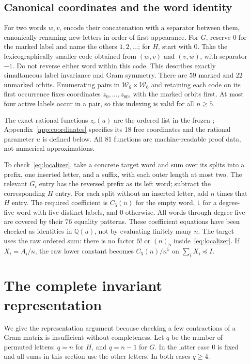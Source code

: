 \documentclass[11pt]{article}
\newcommand{\W}{\mathcal W}
\newcommand{\Q}{\mathbb Q}
\begin{document}
\subsection{Canonical coordinates and the word identity}
For two words $w,v$, encode their concatenation with a separator between
them, canonically renaming new letters in order of first appearance.
For $G$, reserve $0$ for the marked label and name the others $1,2,\ldots$;
for $H$, start with $0$. Take the lexicographically smaller code obtained
from $(w,v)$ and $(v,w)$, with separator $-1$. Do not reverse either word
within this code. This describes exactly simultaneous label invariance
and Gram symmetry. There are $59$ marked and $22$ unmarked orbits.
Enumerating pairs in $\W_6\times\W_6$ and retaining each code on its
first occurrence fixes coordinates $z_0,\ldots,z_{80}$, with the marked
orbits first. At most four active labels occur in a pair, so this indexing
is valid for all $n\ge5$.

The exact rational functions $z_c(u)$ are the ordered list
 in the frozen ;
Appendix~\ref{app:coordinates} specifies its 18 free coordinates and
the rational parameter $u$ is defined below. All $81$ functions are
machine-readable proof data, not numerical approximations.

To check~\eqref{eq:localizer}, take a concrete target word and sum over
its splits into a prefix, one inserted letter, and a suffix, with each
outer length at most two. The relevant $G_i$ entry has the reversed
prefix as its left word; subtract the corresponding $H$ entry. For
each split without an inserted letter, add $n$ times that $H$ entry.
The required coefficient is $C_5(n)$ for the empty word, $1$ for a
degree-five word with five distinct labels, and $0$ otherwise.
All words through degree five are covered by their $76$ equality
patterns. These coefficient equations have been checked as identities
in $\Q(u)$, not by evaluating finitely many $n$.
The target uses the raw ordered sum: there is no factor $5!$ or $(n)_5$
inside~\eqref{eq:localizer}. If $X_i=A_i/n$, the raw lower constant
becomes $C_5(n)/n^5$ on $\sum_iX_i\preceq I$.

\section{The complete invariant representation}\label{sec:representation}
We give the representation argument because checking a few contractions
of a Gram matrix is insufficient without completeness. Let $q$ be the
number of permuted letters: $q=n$ for $H$, and $q=n-1$ for $G$.
In the latter case $0$ is fixed and all sums in this section use the
other letters. In both cases $q\ge4$.
\end{document}
